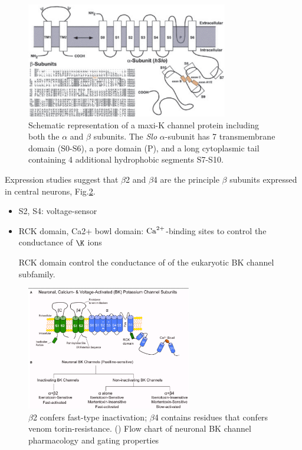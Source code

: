 \begin{figure}[hbt]
  \centerline{\includegraphics[height=5cm,
    angle=0]{./images/Maxi-K_channel.eps}}
  \caption{Schematic representation of a maxi-K channel protein including both
  the $\alpha$ and $\beta$ subunits. The {\it Slo} $\alpha$-subunit has 7
  transmembrane domain (S0-S6), a pore domain (P), and a long cytoplasmic tail
  containing 4 additional hydrophobic segments S7-S10. \citep{gribkoff2001}}
\label{fig:MaxiK_channel}
\end{figure}

Expression studies suggest that $\beta$2 and $\beta$4 are the principle
$\beta$ subunits expressed in central neurons, Fig.\ref{fig:BK(Ca)-channels}.
\begin{itemize}
  \item S2, S4: voltage-sensor

\label{sec:RCK-domain-BK-channel}

  \item RCK domain, Ca2+ bowl domain: ${\text{Ca}^{2+}}$-binding sites to control the
  conductance of $\K$ ions
  
  RCK domain control the conductance of  of the eukaryotic  BK 
  channel subfamily.
 
\end{itemize}


\begin{figure}[hbt]
  \centerline{\includegraphics[height=5.4cm,
    angle=0]{./images/BK(Ca)-channels.eps}}
\caption{$\beta$2 confers fast-type inactivation; $\beta$4 contains residues
that confers venom torin-resistance. () Flow chart of neuronal BK channel
pharmacology and gating properties}
\label{fig:BK(Ca)-channels}
\end{figure}

